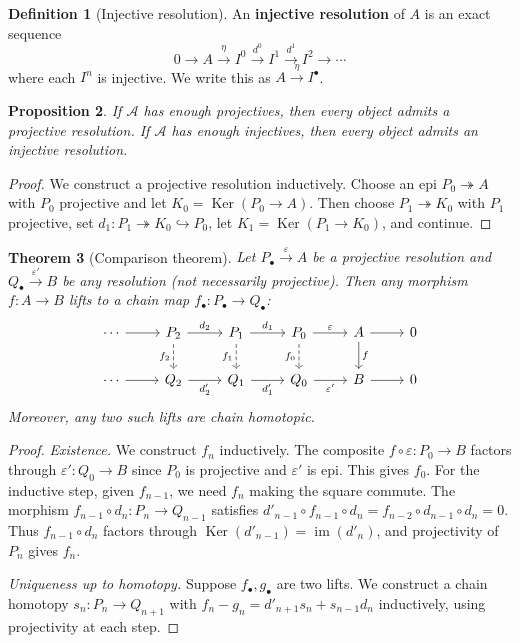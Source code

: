 \documentclass[a4paper,12pt]{book}
\DeclareMathOperator{\im}{im}
\DeclareMathOperator{\Ker}{Ker}
\theoremstyle{definition}
\newtheorem{definition}{Definition}[section]
\theoremstyle{plain}
\newtheorem{theorem}[definition]{Theorem}
\newtheorem{proposition}[definition]{Proposition}
\theoremstyle{remark}
\begin{document}
\begin{definition}[Injective resolution]\label{def:inj-resolution}
An \textbf{injective resolution} of $A$ is an exact sequence
\[
    0 \longrightarrow A \xrightarrow{\eta} I^0 \xrightarrow{d^0} I^1
    \xrightarrow{d^1} I^2 \longrightarrow \cdots
\]
where each $I^n$ is injective. We write this as $A \xrightarrow{\eta} I^\bullet$.
\end{definition}

\begin{proposition}\label{prop:resolution-existence}
If $\mathcal{A}$ has enough projectives, then every object admits a projective resolution.
If $\mathcal{A}$ has enough injectives, then every object admits an injective resolution.
\end{proposition}

\begin{proof}
We construct a projective resolution inductively. Choose an epi $P_0 \twoheadrightarrow A$
with $P_0$ projective and let $K_0 = \Ker(P_0 \to A)$. Then choose $P_1 \twoheadrightarrow K_0$
with $P_1$ projective, set $d_1 \colon P_1 \twoheadrightarrow K_0 \hookrightarrow P_0$,
let $K_1 = \Ker(P_1 \to K_0)$, and continue.
\end{proof}

\begin{theorem}[Comparison theorem]\label{thm:comparison}
Let $P_\bullet \xrightarrow{\varepsilon} A$ be a projective resolution and
$Q_\bullet \xrightarrow{\varepsilon'} B$ be any resolution (not necessarily projective).
Then any morphism $f \colon A \to B$ lifts to a chain map
$f_\bullet \colon P_\bullet \to Q_\bullet$:
\[
\begin{tikzcd}
    \cdots \arrow[r] & P_2 \arrow[r, "d_2"] \arrow[d, dashed, "f_2"'] & P_1 \arrow[r, "d_1"] \arrow[d, dashed, "f_1"'] & P_0 \arrow[r, "\varepsilon"] \arrow[d, dashed, "f_0"'] & A \arrow[r] \arrow[d, "f"] & 0 \\
    \cdots \arrow[r] & Q_2 \arrow[r, "d_2'"'] & Q_1 \arrow[r, "d_1'"'] & Q_0 \arrow[r, "\varepsilon'"'] & B \arrow[r] & 0
\end{tikzcd}
\]
Moreover, any two such lifts are chain homotopic.
\end{theorem}

\begin{proof}
\textit{Existence.} We construct $f_n$ inductively. The composite $f \circ \varepsilon \colon P_0 \to B$
factors through $\varepsilon' \colon Q_0 \to B$ since $P_0$ is projective and $\varepsilon'$
is epi. This gives $f_0$. For the inductive step, given $f_{n-1}$, we need $f_n$ making the
square commute. The morphism $f_{n-1} \circ d_n \colon P_n \to Q_{n-1}$ satisfies
$d'_{n-1} \circ f_{n-1} \circ d_n = f_{n-2} \circ d_{n-1} \circ d_n = 0$. Thus
$f_{n-1} \circ d_n$ factors through $\Ker(d'_{n-1}) = \im(d'_n)$, and projectivity of $P_n$
gives $f_n$.

\textit{Uniqueness up to homotopy.} Suppose $f_\bullet, g_\bullet$ are two lifts.
We construct a chain homotopy $s_n \colon P_n \to Q_{n+1}$ with
$f_n - g_n = d'_{n+1} s_n + s_{n-1} d_n$ inductively, using projectivity at each step.
\end{proof}
\end{document}
